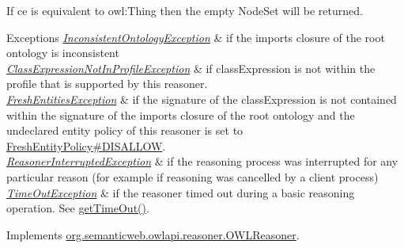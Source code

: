 If {\ttfamily ce} is equivalent to {\ttfamily owl\-:Thing} then the empty {\ttfamily Node\-Set} will be returned.


\begin{DoxyExceptions}{Exceptions}
{\em \hyperlink{classorg_1_1semanticweb_1_1owlapi_1_1reasoner_1_1_inconsistent_ontology_exception}{Inconsistent\-Ontology\-Exception}} & if the imports closure of the root ontology is inconsistent \\
\hline
{\em \hyperlink{classorg_1_1semanticweb_1_1owlapi_1_1reasoner_1_1_class_expression_not_in_profile_exception}{Class\-Expression\-Not\-In\-Profile\-Exception}} & if {\ttfamily class\-Expression} is not within the profile that is supported by this reasoner. \\
\hline
{\em \hyperlink{classorg_1_1semanticweb_1_1owlapi_1_1reasoner_1_1_fresh_entities_exception}{Fresh\-Entities\-Exception}} & if the signature of the class\-Expression is not contained within the signature of the imports closure of the root ontology and the undeclared entity policy of this reasoner is set to \hyperlink{enumorg_1_1semanticweb_1_1owlapi_1_1reasoner_1_1_fresh_entity_policy_a762eae6d5b2449d125311ecaabfdc8d0}{Fresh\-Entity\-Policy\#\-D\-I\-S\-A\-L\-L\-O\-W}. \\
\hline
{\em \hyperlink{classorg_1_1semanticweb_1_1owlapi_1_1reasoner_1_1_reasoner_interrupted_exception}{Reasoner\-Interrupted\-Exception}} & if the reasoning process was interrupted for any particular reason (for example if reasoning was cancelled by a client process) \\
\hline
{\em \hyperlink{classorg_1_1semanticweb_1_1owlapi_1_1reasoner_1_1_time_out_exception}{Time\-Out\-Exception}} & if the reasoner timed out during a basic reasoning operation. See \hyperlink{classorg_1_1semanticweb_1_1owlapi_1_1reasoner_1_1impl_1_1_o_w_l_reasoner_base_af55342eaaabb1b72dacfde7a181b93d2}{get\-Time\-Out()}. \\
\hline
\end{DoxyExceptions}


Implements \hyperlink{interfaceorg_1_1semanticweb_1_1owlapi_1_1reasoner_1_1_o_w_l_reasoner_a8a8617949b6669d58e78a368babdab69}{org.\-semanticweb.\-owlapi.\-reasoner.\-O\-W\-L\-Reasoner}.

